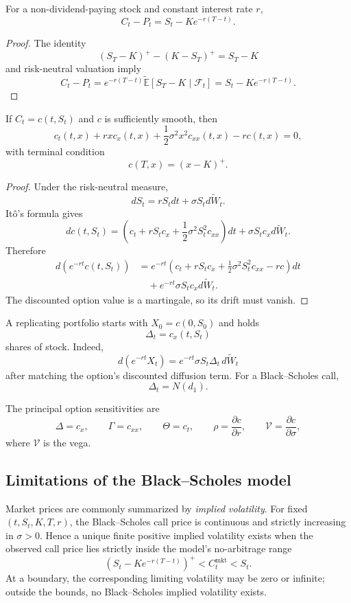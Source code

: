 \begin{thm}
For a non-dividend-paying stock and constant interest rate $r$,
\[
C_t-P_t=S_t-Ke^{-r(T-t)}.
\]
\end{thm}

\begin{proof}
The identity
\[
(S_T-K)^+-(K-S_T)^+=S_T-K
\]
and risk-neutral valuation imply
\[
C_t-P_t
=e^{-r(T-t)}\widetilde{\mathbb{E}}[S_T-K\mid\mathcal{F}_t]
=S_t-Ke^{-r(T-t)}.
\]
\end{proof}

\begin{thm}
If $C_t=c(t,S_t)$ and $c$ is sufficiently smooth, then
\[
c_t(t,x)+rx c_x(t,x)
+\frac12\sigma^2x^2c_{xx}(t,x)-rc(t,x)=0,
\]
with terminal condition
\[
c(T,x)=(x-K)^+.
\]
\end{thm}

\begin{proof}
Under the risk-neutral measure,
\[
dS_t=rS_tdt+\sigma S_td\widetilde W_t.
\]
It\^o's formula gives
\[
dc(t,S_t)
=\left(c_t+rS_tc_x+\frac12\sigma^2S_t^2c_{xx}\right)dt
 +\sigma S_tc_xd\widetilde W_t.
\]
Therefore
\[
\begin{aligned}
d(e^{-rt}c(t,S_t))
&=e^{-rt}
 \left(c_t+rS_tc_x+\frac12\sigma^2S_t^2c_{xx}-rc\right)dt\\
&\quad+e^{-rt}\sigma S_tc_xd\widetilde W_t.
\end{aligned}
\]
The discounted option value is a martingale, so its drift must vanish.
\end{proof}

A replicating portfolio starts with $X_0=c(0,S_0)$ and holds
\[
\Delta_t=c_x(t,S_t)
\]
shares of stock. Indeed,
\[
d(e^{-rt}X_t)=e^{-rt}\sigma S_t\Delta_t\,d\widetilde W_t
\]
after matching the option's discounted diffusion term. For a Black--Scholes call,
\[
\Delta_t=N(d_1).
\]

The principal option sensitivities are
\[
\Delta=c_x,
\qquad
\Gamma=c_{xx},
\qquad
\Theta=c_t,
\qquad
\rho=\frac{\partial c}{\partial r},
\qquad
\mathcal{V}=\frac{\partial c}{\partial\sigma},
\]
where $\mathcal{V}$ is the vega.

\subsection{Limitations of the Black--Scholes model}

Market prices are commonly summarized by \emph{implied volatility}. For fixed $(t,S_t,K,T,r)$, the Black--Scholes call price is continuous and strictly increasing in $\sigma>0$. Hence a unique finite positive implied volatility exists when the observed call price lies strictly inside the model's no-arbitrage range
\[
(S_t-Ke^{-r(T-t)})^+<C_t^{\mathrm{mkt}}<S_t.
\]
At a boundary, the corresponding limiting volatility may be zero or infinite; outside the bounds, no Black--Scholes implied volatility exists.


